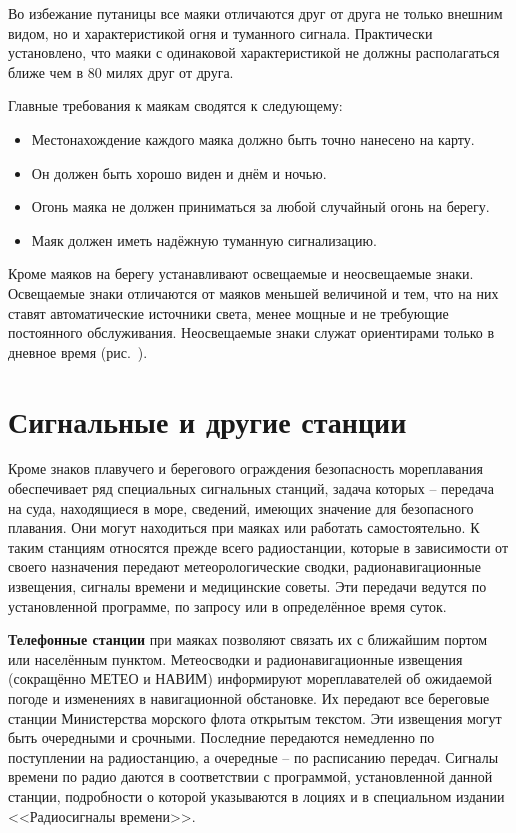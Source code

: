 Во избежание путаницы все маяки отличаются друг от друга не только
внешним видом, но и характеристикой огня и туманного
сигнала. Практически установлено, что маяки с одинаковой
характеристикой не должны располагаться ближе чем в 80 милях друг от
друга.

Главные требования к маякам сводятся к следующему: 

\begin{itemize}
\item Местонахождение каждого маяка должно быть точно нанесено на карту. 
\item Он должен быть хорошо виден и днём и ночью. 
\item Огонь маяка не должен приниматься за любой случайный огонь на берегу. 
\item Маяк должен иметь надёжную туманную сигнализацию. 
\end{itemize}

Кроме маяков на берегу устанавливают освещаемые и неосвещаемые
знаки. Освещаемые знаки отличаются от маяков меньшей величиной и тем,
что на них ставят автоматические источники света, менее мощные и не
требующие постоянного обслуживания. Неосвещаемые знаки служат
ориентирами только в дневное время (рис.~).

\section{Сигнальные и другие станции}

Кроме знаков плавучего и берегового ограждения безопасность
мореплавания обеспечивает ряд специальных сигнальных станций, задача
которых \--- передача на суда, находящиеся в море, сведений, имеющих
значение для безопасного плавания. Они могут находиться при маяках или
работать самостоятельно. К таким станциям относятся прежде всего
радиостанции, которые в зависимости от своего назначения передают
метеорологические сводки, радионавигационные извещения, сигналы
времени и медицинские советы. Эти передачи ведутся по установленной
программе, по запросу или в определённое время суток.

\textbf{Телефонные станции} при маяках позволяют связать их с
ближайшим портом или населённым пунктом. Метеосводки и
радионавигационные извещения (сокращённо МЕТЕО и НАВИМ) информируют
мореплавателей об ожидаемой погоде и изменениях в навигационной
обстановке. Их передают все береговые станции Министерства морского
флота открытым текстом. Эти извещения могут быть очередными и
срочными. Последние передаются немедленно по поступлении на
радиостанцию, а очередные \--- по расписанию передач. Сигналы времени
по радио даются в соответствии с программой, установленной данной
станции, подробности о которой указываются в лоциях и в специальном
издании <<Радиосигналы времени>>.

